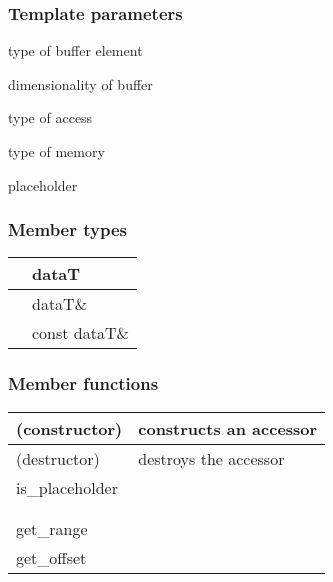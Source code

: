 \documentclass[letterpaper,10pt,english]{sphinxmanual}
\begin{document}
\subsubsection*{Template parameters}

\begin{DUlineblock}{0em}
\item[]  \sphinxhyphen{} type of buffer element
\item[] \sphinxhyphen{} dimensionality of buffer
\item[]  \sphinxhyphen{} type of access
\item[]  \sphinxhyphen{} type of memory
\item[]  \sphinxhyphen{} placeholder
\end{DUlineblock}
\subsubsection*{Member types}


\begin{savenotes}\sphinxattablestart
\centering
\begin{tabulary}{\linewidth}[t]{|T|T|}
\hline

&
dataT
\\
\hline
{}
&
dataT\&
\\
\hline
{}
&
const dataT\&
\\
\hline
\end{tabulary}
\par
\sphinxattableend\end{savenotes}
\subsubsection*{Member functions}


\begin{savenotes}\sphinxattablestart
\centering
\begin{tabulary}{\linewidth}[t]{|T|T|}
\hline

(constructor)
&
constructs an accessor
\\
\hline
(destructor)
&
destroys the accessor
\\
\hline
is\_placeholder
&\\
\hline
{\hyperref[\detokenize{programming-interface/data/accessor:get-size}]{}}
&\\
\hline
{\hyperref[\detokenize{programming-interface/data/accessor:get-count}]{}}
&\\
\hline
get\_range
&\\
\hline
get\_offset
&\\
\hline
\end{tabulary}
\par
\sphinxattableend\end{savenotes}
\end{document}
